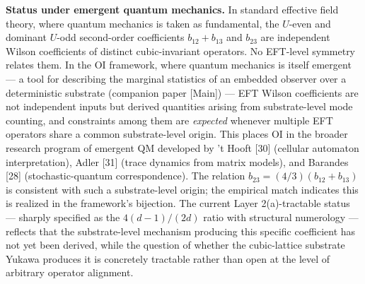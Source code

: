 \documentclass[
]{article}
\begin{document}
\textbf{Status under emergent quantum mechanics.} In standard effective
field theory, where quantum mechanics is taken as fundamental, the
\(U\)-even and dominant \(U\)-odd second-order coefficients
\(b_{12}+b_{13}\) and \(b_{23}\) are independent Wilson coefficients of
distinct cubic-invariant operators. No EFT-level symmetry relates them.
In the OI framework, where quantum mechanics is itself emergent --- a
tool for describing the marginal statistics of an embedded observer over
a deterministic substrate (companion paper {[}Main{]}) --- EFT Wilson
coefficients are not independent inputs but derived quantities arising
from substrate-level mode counting, and constraints among them are
\emph{expected} whenever multiple EFT operators share a common
substrate-level origin. This places OI in the broader research program
of emergent QM developed by 't Hooft {[}30{]} (cellular automaton
interpretation), Adler {[}31{]} (trace dynamics from matrix models), and
Barandes {[}28{]} (stochastic-quantum correspondence). The relation
\(b_{23} = (4/3)(b_{12}+b_{13})\) is consistent with such a
substrate-level origin; the empirical match indicates this is realized
in the framework's bijection. The current Layer 2(a)-tractable status
--- sharply specified as the \(4(d-1)/(2d)\) ratio with structural
numerology --- reflects that the substrate-level mechanism producing
this specific coefficient has not yet been derived, while the question
of whether the cubic-lattice substrate Yukawa produces it is concretely
tractable rather than open at the level of arbitrary operator alignment.
\end{document}
